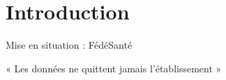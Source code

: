 \section{Introduction}

\begin{frame}{Mise en situation : FédéSanté}
\end{frame}

\begin{frame}{« Les données ne quittent jamais l'établissement »}
\end{frame}

